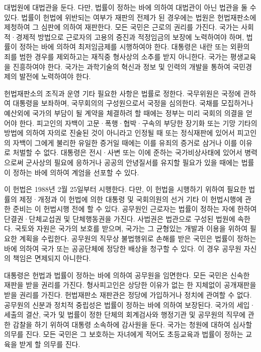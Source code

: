 \documentclass[doctor, korean]{pnuthesis}
\begin{document}
대법원에 대법관을 둔다. 다만, 법률이 정하는 바에 의하여 대법관이 아닌 법관을 둘 수 있다. 법률이 헌법에 위반되는 여부가 재판의 전제가 된 경우에는 법원은 헌법재판소에 제청하여 그 심판에 의하여 재판한다. 모든 국민은 근로의 권리를 가진다. 국가는 사회적·경제적 방법으로 근로자의 고용의 증진과 적정임금의 보장에 노력하여야 하며, 법률이 정하는 바에 의하여 최저임금제를 시행하여야 한다. 대통령은 내란 또는 외환의 죄를 범한 경우를 제외하고는 재직중 형사상의 소추를 받지 아니한다. 국가는 평생교육을 진흥하여야 한다. 국가는 과학기술의 혁신과 정보 및 인력의 개발을 통하여 국민경제의 발전에 노력하여야 한다.

헌법재판소의 조직과 운영 기타 필요한 사항은 법률로 정한다. 국무위원은 국정에 관하여 대통령을 보좌하며, 국무회의의 구성원으로서 국정을 심의한다. 국채를 모집하거나 예산외에 국가의 부담이 될 계약을 체결하려 할 때에는 정부는 미리 국회의 의결을 얻어야 한다. 피고인의 자백이 고문·폭행·협박·구속의 부당한 장기화 또는 기망 기타의 방법에 의하여 자의로 진술된 것이 아니라고 인정될 때 또는 정식재판에 있어서 피고인의 자백이 그에게 불리한 유일한 증거일 때에는 이를 유죄의 증거로 삼거나 이를 이유로 처벌할 수 없다. 대통령은 전시·사변 또는 이에 준하는 국가비상사태에 있어서 병력으로써 군사상의 필요에 응하거나 공공의 안녕질서를 유지할 필요가 있을 때에는 법률이 정하는 바에 의하여 계엄을 선포할 수 있다.

이 헌법은 1988년 2월 25일부터 시행한다. 다만, 이 헌법을 시행하기 위하여 필요한 법률의 제정·개정과 이 헌법에 의한 대통령 및 국회의원의 선거 기타 이 헌법시행에 관한 준비는 이 헌법시행 전에 할 수 있다. 공무원인 근로자는 법률이 정하는 자에 한하여 단결권·단체교섭권 및 단체행동권을 가진다. 사법권은 법관으로 구성된 법원에 속한다. 국토와 자원은 국가의 보호를 받으며, 국가는 그 균형있는 개발과 이용을 위하여 필요한 계획을 수립한다. 공무원의 직무상 불법행위로 손해를 받은 국민은 법률이 정하는 바에 의하여 국가 또는 공공단체에 정당한 배상을 청구할 수 있다. 이 경우 공무원 자신의 책임은 면제되지 아니한다.

대통령은 헌법과 법률이 정하는 바에 의하여 공무원을 임면한다. 모든 국민은 신속한 재판을 받을 권리를 가진다. 형사피고인은 상당한 이유가 없는 한 지체없이 공개재판을 받을 권리를 가진다. 헌법재판소 재판관은 정당에 가입하거나 정치에 관여할 수 없다. 공무원의 신분과 정치적 중립성은 법률이 정하는 바에 의하여 보장된다. 국가의 세입·세출의 결산, 국가 및 법률이 정한 단체의 회계검사와 행정기관 및 공무원의 직무에 관한 감찰을 하기 위하여 대통령 소속하에 감사원을 둔다. 국가는 청원에 대하여 심사할 의무를 진다. 모든 국민은 그 보호하는 자녀에게 적어도 초등교육과 법률이 정하는 교육을 받게 할 의무를 진다.
\end{document}
